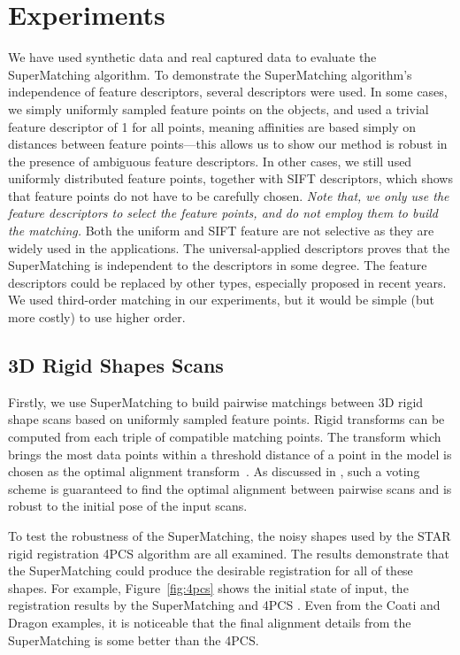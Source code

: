 \section{Experiments}
\label{sec:experiments}

We have used synthetic data and real captured data to evaluate the SuperMatching algorithm.
To demonstrate the SuperMatching algorithm's independence of feature descriptors, several descriptors were used.
In some cases, we simply uniformly sampled feature points on the objects, and used a trivial feature descriptor of 1 for all points, meaning affinities are based simply on distances between feature points---this allows us to show our method is robust in the presence of ambiguous feature descriptors.
In other cases, we still used uniformly distributed feature points, together with SIFT descriptors, which shows that feature points do not have to be carefully chosen.
\emph{Note that, we only use the feature descriptors to select the feature points, and do not employ them to build the matching.}
Both the uniform and SIFT feature are not selective as they are widely used in the applications.
The universal-applied descriptors proves that the SuperMatching is independent to the descriptors in some degree.
The feature descriptors could be replaced by other types, especially proposed in recent years.
We used third-order matching in our experiments, but it would be simple (but more costly) to use higher order.

\subsection{3D Rigid Shapes Scans}
\label{subsec:3DRigid}

Firstly, we use SuperMatching to build pairwise matchings between 3D rigid shape scans based on uniformly sampled feature points.
Rigid transforms can be computed from each triple of compatible matching points.
The transform which brings the most data points within a threshold distance of a point in the model is chosen as the optimal alignment transform~\cite{Huttenlocher90}.
As discussed in \cite{Gelfand05}, such a voting scheme is guaranteed to find the optimal alignment between pairwise scans and is robust to the initial pose of the input scans.

To test the robustness of the SuperMatching, the noisy shapes used by the STAR rigid registration 4PCS algorithm \cite{Aiger08} are all examined.
The results demonstrate that the SuperMatching could produce the desirable registration for all of these shapes.
For example, Figure~\ref{fig:4pcs} shows the initial state of input, the registration results by the SuperMatching and 4PCS \cite{Aiger08}.
Even from the Coati and Dragon examples, it is noticeable that the final alignment details from the SuperMatching is some better than the 4PCS.

